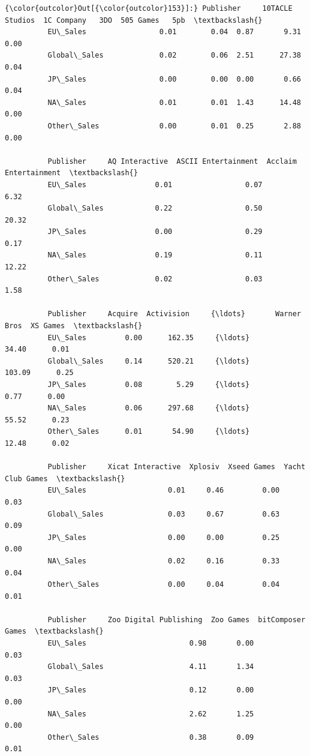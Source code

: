 \documentclass[11pt]{article}
\begin{document}
\begin{Verbatim}[commandchars=\\\{\}]
{\color{outcolor}Out[{\color{outcolor}153}]:} Publisher     10TACLE Studios  1C Company   3DO  505 Games   5pb  \textbackslash{}
          EU\_Sales                 0.01        0.04  0.87       9.31  0.00   
          Global\_Sales             0.02        0.06  2.51      27.38  0.04   
          JP\_Sales                 0.00        0.00  0.00       0.66  0.04   
          NA\_Sales                 0.01        0.01  1.43      14.48  0.00   
          Other\_Sales              0.00        0.01  0.25       2.88  0.00   
          
          Publisher     AQ Interactive  ASCII Entertainment  Acclaim Entertainment  \textbackslash{}
          EU\_Sales                0.01                 0.07                   6.32   
          Global\_Sales            0.22                 0.50                  20.32   
          JP\_Sales                0.00                 0.29                   0.17   
          NA\_Sales                0.19                 0.11                  12.22   
          Other\_Sales             0.02                 0.03                   1.58   
          
          Publisher     Acquire  Activision     {\ldots}       Warner Bros  XS Games  \textbackslash{}
          EU\_Sales         0.00      162.35     {\ldots}             34.40      0.01   
          Global\_Sales     0.14      520.21     {\ldots}            103.09      0.25   
          JP\_Sales         0.08        5.29     {\ldots}              0.77      0.00   
          NA\_Sales         0.06      297.68     {\ldots}             55.52      0.23   
          Other\_Sales      0.01       54.90     {\ldots}             12.48      0.02   
          
          Publisher     Xicat Interactive  Xplosiv  Xseed Games  Yacht Club Games  \textbackslash{}
          EU\_Sales                   0.01     0.46         0.00              0.03   
          Global\_Sales               0.03     0.67         0.63              0.09   
          JP\_Sales                   0.00     0.00         0.25              0.00   
          NA\_Sales                   0.02     0.16         0.33              0.04   
          Other\_Sales                0.00     0.04         0.04              0.01   
          
          Publisher     Zoo Digital Publishing  Zoo Games  bitComposer Games  \textbackslash{}
          EU\_Sales                        0.98       0.00               0.03   
          Global\_Sales                    4.11       1.34               0.03   
          JP\_Sales                        0.12       0.00               0.00   
          NA\_Sales                        2.62       1.25               0.00   
          Other\_Sales                     0.38       0.09               0.01   
          

\end{Verbatim}
\end{document}
